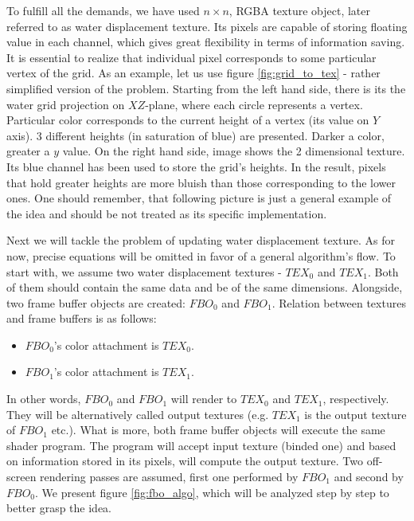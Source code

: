 \documentclass{report}
\begin{document}
To fulfill all the demands, we have used $n \times n$, RGBA texture object, later referred to as water displacement texture. Its pixels are capable of storing floating value in each channel, which gives great flexibility in terms of information saving. It is essential to realize that individual pixel corresponds to some particular vertex of the grid. As an example, let us use figure \ref{fig:grid_to_tex} - rather simplified version of the problem. Starting from the left hand side, there is its the water grid projection on $XZ$-plane, where each circle represents a vertex. Particular color corresponds to the current height of a vertex (its value on $Y$ axis). 3 different heights (in saturation of blue) are presented. Darker a color, greater a $y$ value. On the right hand side, image shows the 2 dimensional texture. Its blue channel has been used to store the grid's heights. In the result, pixels that hold greater heights are more bluish than those corresponding to the lower ones. One should remember, that following picture is just a general example of the idea and should be not treated as its specific implementation.

Next we will tackle the problem of updating water displacement texture. As for now, precise equations will be omitted in favor of a general algorithm's flow. To start with, we assume two water displacement textures - $TEX_0$ and $TEX_1$. Both of them should contain the same data and be of the same dimensions. Alongside, two frame buffer objects are created: $FBO_0$ and $FBO_1$. Relation between textures and frame buffers is as follows:

\begin{itemize}
\item $FBO_0$'s color attachment is $TEX_0$.
\item $FBO_1$'s color attachment is $TEX_1$.
\end{itemize}

In other words, $FBO_0$ and $FBO_1$ will render to $TEX_0$ and $TEX_1$, respectively. They will be alternatively called output textures (e.g.  $TEX_1$ is the output texture of $FBO_1$ etc.). What is more, both frame buffer objects will execute the same shader program. The program will accept input texture (binded one) and based on information stored in its pixels, will compute the output texture. Two off-screen rendering passes are assumed, first one performed by $FBO_1$ and second by $FBO_0$. We present figure \ref{fig:fbo_algo}, which will be analyzed step by step to better grasp the idea.
\end{document}
